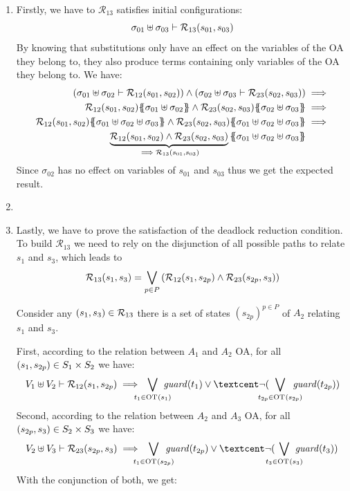 \documentclass[runningheads]{llncs}
\begin{document}
\begin{enumerate}
\item Firstly, we have to $\mathcal{R}_{13}$ satisfies initial configurations:
\[\sigma_{01} \uplus \sigma_{03} \vdash \mathcal{R}_{13} {\left(s_{01}, s_{03}\right)}\]
By knowing that substitutions only have an effect on the variables of the OA they belong to, they also produce terms containing only variables of the OA they belong to. We have:
\begin{align*}
\mpar{\sigma_{01} \uplus \sigma_{02} \vdash \mathcal{R}_{12}\mpar{s_{01}, s_{02}}} \wedge \mpar
{\sigma_{02} \uplus \sigma_{03} \vdash \mathcal{R}_{23}\mpar{s_{02}, s_{03}}}&\implies\\
\mathcal{R}_{12}\mpar{s_{01},s_{02}}\psubst{\sigma_{01} \uplus \sigma_{02}} \wedge \mathcal{R}_{23}\mpar{s_{02}, s_{03}}\psubst{\sigma_{02} \uplus \sigma_{03}}&\implies\\
\mathcal{R}_{12}\mpar{s_{01},s_{02}}\psubst{\sigma_{01} \uplus \sigma_{02} \uplus \sigma_{03}} \wedge \mathcal{R}_{23}\mpar{s_{02}, s_{03}}\psubst{\sigma_{01} \uplus \sigma_{02} \uplus \sigma_{03}}&\implies\\ 
\underbrace{\mathcal{R}_{12}\mpar{s_{01},s_{02}}\wedge \mathcal{R}_{23}\mpar{s_{02}, s_{03}}}_{\implies \mathcal{R}_{13} \mpar{s_{01}, s_{03}}}\psubst{\sigma_{01} \uplus \sigma_{02} \uplus \sigma_{03}} %
 \end{align*}
Since $\sigma_{02}$ has no effect on variables of $s_{01}$ and $s_{03}$ thus we get the expected result.

\item {}

\item Lastly, we have to prove the satisfaction of the deadlock reduction condition. 
 To build $\mathcal{R}_{13}$ we need to rely on the disjunction of all possible paths to relate $s_1$ and $s_3$, which leads to \[{\displaystyle \mathcal{R}_{13}(s_1,s_3)=\bigvee_{{p\in P}}{\left(\mathcal{R}_{12}{\left(s_1,s_{2p}\right)} \wedge \mathcal{R}_{23}{\left(s_{2p},s_3\right)}\right)}}\]

Consider any ${\left(s_{1}, s_{3}\right)} \in \mathcal{R}_{13}$  there is a set of states $(s_{2p})^{p\in P}$ of $A_2$ relating  $s_{1}$ and $s_{3}$.


First, according to the relation between $A_1$ and $A_2$ OA,  for all ${\left(s_1, s_{2p}\right)} \in S_1\times S_2$  we have:
\begin{multline*}
V_1 \uplus V_2  \vdash \mathcal{R}_{12}\mpar{s_1, s_{2p}} \implies \bigvee_\subbox{t_1 \in \fOT{s_1}} \fguard{t_1}  \lor¢ \lnot( \bigvee_\subbox{t_{2p} \in \fOT{s_{2p}}} \fguard{t_{2p}}  )
\end{multline*}
Second, according to the relation between $A_2$ and $A_3$ OA, for all ${\left(s_{2p},s_3\right)} \in S_2\times S_3$  we have:
\begin{multline*}
 V_2 \uplus V_3  \vdash \mathcal{R}_{23}\mpar{s_{2p},s_3} \implies  \bigvee_\subbox{t_1 \in \fOT{s_{2p}}} \fguard{t_{2p}}  \lor¢ \lnot( \bigvee_\subbox{t_3 \in \fOT{s_3}} \fguard{t_3} )
\end{multline*}
With the conjunction of both, we get:


\end{enumerate}
\end{document}
